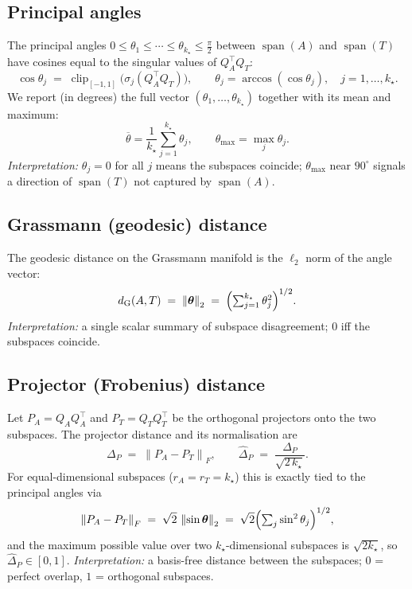 \documentclass[11pt]{article}
\newcommand{\norm}[1]{\left\lVert #1 \right\rVert}
\newcommand{\fro}[1]{\norm{#1}_{F}}
\newcommand{\twonorm}[1]{\norm{#1}_{2}}
\newcommand{\T}{^{\!\top}}
\newcommand{\range}{\operatorname{span}}
\begin{document}
\subsection{Principal angles}
The principal angles $0\le\theta_1\le\cdots\le\theta_{k_\star}\le\tfrac{\pi}{2}$
between $\range(A)$ and $\range(T)$ have cosines equal to the singular values of
$Q_A\T Q_T$:
\begin{equation}
  \cos\theta_j \;=\; \operatorname{clip}_{[-1,1]}\!\bigl(\sigma_j(Q_A\T Q_T)\bigr),
  \qquad
  \theta_j = \arccos(\cos\theta_j), \quad j = 1,\dots,k_\star.
  \label{eq:angles}
\end{equation}
We report (in degrees) the full vector $(\theta_1,\dots,\theta_{k_\star})$ together
with its mean and maximum:
\begin{equation}
  \overline{\theta} = \frac{1}{k_\star}\sum_{j=1}^{k_\star}\theta_j,
  \qquad
  \theta_{\max} = \max_{j}\theta_j .
\end{equation}
\emph{Interpretation:} $\theta_j=0$ for all $j$ means the subspaces coincide;
$\theta_{\max}$ near $90^\circ$ signals a direction of $\range(T)$ not captured by
$\range(A)$.

\subsection{Grassmann (geodesic) distance}
The geodesic distance on the Grassmann manifold is the $\ell_2$ norm of the angle
vector:
\begin{equation}
  d_{\mathrm{G}}(A,T) \;=\; \twonorm{\bm\theta} \;=\;
  \Bigl(\textstyle\sum_{j=1}^{k_\star}\theta_j^2\Bigr)^{1/2}.
  \label{eq:grassmann}
\end{equation}
\emph{Interpretation:} a single scalar summary of subspace disagreement; $0$ iff
the subspaces coincide.

\subsection{Projector (Frobenius) distance}
Let $P_A = Q_A Q_A\T$ and $P_T = Q_T Q_T\T$ be the orthogonal projectors onto the
two subspaces. The projector distance and its normalisation are
\begin{equation}
  \Delta_P \;=\; \fro{P_A - P_T},
  \qquad
  \widehat{\Delta}_P \;=\; \frac{\Delta_P}{\sqrt{2\,k_\star}} .
  \label{eq:projector}
\end{equation}
For equal-dimensional subspaces ($r_A=r_T=k_\star$) this is exactly tied to the
principal angles via
\begin{equation}
  \fro{P_A - P_T} \;=\; \sqrt{2}\,\twonorm{\sin\bm\theta}
  \;=\; \sqrt{2}\Bigl(\textstyle\sum_{j}\sin^2\theta_j\Bigr)^{1/2},
\end{equation}
and the maximum possible value over two $k_\star$-dimensional subspaces is
$\sqrt{2k_\star}$, so $\widehat\Delta_P\in[0,1]$.
\emph{Interpretation:} a basis-free distance between the subspaces; $0$ = perfect
overlap, $1$ = orthogonal subspaces.
\end{document}
